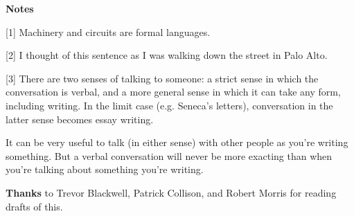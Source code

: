 \textbf{Notes}

[1] Machinery and circuits are formal languages.

[2] I thought of this sentence as I was walking down the street
                  in Palo Alto.

[3] There are two senses of talking to someone: a strict sense
                  in which the conversation is verbal, and a more general sense
                  in which it can take any form, including writing. In the limit
                  case (e.g. Seneca's letters), conversation in the latter sense
                  becomes essay writing.

It can be very useful to
                  talk (in either sense) with other people as you're writing
                  something. But a verbal conversation will never be more
                  exacting than when you're talking about something you're
                  writing.




                    \textbf{Thanks} to Trevor Blackwell, Patrick Collison, and
                    Robert Morris for reading drafts of this. 


              
            
          
